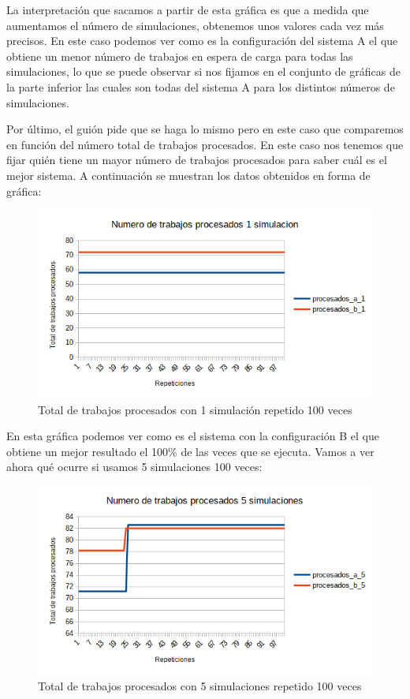 \documentclass[11pt,a4paper]{report}
\begin{document}
La interpretación que sacamos a partir de esta gráfica es que a medida que aumentamos el número de simulaciones, obtenemos unos valores cada vez más precisos. En este caso podemos ver como es la configuración del sistema A el que obtiene un menor número de trabajos en espera de carga para todas las simulaciones, lo que se puede observar si nos fijamos en el conjunto de gráficas de la parte inferior las cuales son todas del sistema A para los distintos números de simulaciones.

\newpage
Por último, el guión pide que se haga lo mismo pero en este caso que comparemos en función del número total de trabajos procesados. En este caso nos tenemos que fijar quién tiene un mayor número de trabajos procesados para saber cuál es el mejor sistema. A continuación se muestran los datos obtenidos en forma de gráfica:

\begin{figure}[H]
\centering
\includegraphics[width=\textwidth]{img/cap-3/ttp_1-5-1.png}
\caption{Total de trabajos procesados con 1 simulación repetido 100 veces}
\label{}
\end{figure}

En esta gráfica podemos ver como es el sistema con la configuración B el que obtiene un mejor resultado el 100\% de las veces que se ejecuta. Vamos a ver ahora qué ocurre si usamos 5 simulaciones 100 veces:

\begin{figure}[H]
\centering
\includegraphics[width=\textwidth]{img/cap-3/ttp_1-5-5.png}
\caption{Total de trabajos procesados con 5 simulaciones repetido 100 veces}
\label{}
\end{figure}
\end{document}
